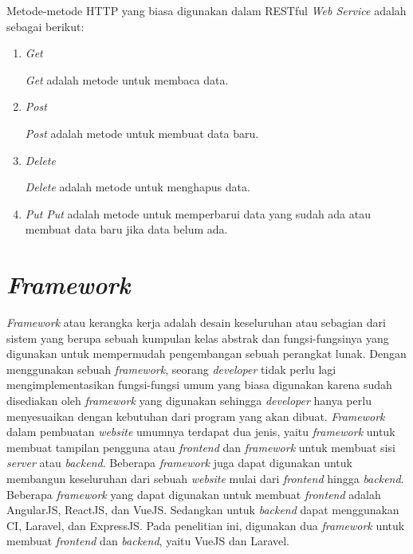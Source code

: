 	Metode-metode HTTP yang biasa digunakan dalam RESTful \textit{Web Service} adalah sebagai berikut:

\begin{enumerate}

	\item \textit{Get}

		\textit{Get} adalah metode untuk membaca data.

	\item \textit{Post}

		\textit{Post} adalah metode untuk membuat data baru.

	\item \textit{Delete}

		\textit{Delete} adalah metode untuk menghapus data.

	\item \textit{Put}
		\textit{Put} adalah metode untuk memperbarui data yang sudah ada atau membuat data baru jika data belum ada.
\end{enumerate}

\section{\textit{Framework}}

	\textit{Framework} atau kerangka kerja adalah desain keseluruhan atau sebagian dari sistem yang berupa sebuah kumpulan kelas abstrak dan fungsi-fungsinya yang digunakan untuk mempermudah pengembangan sebuah perangkat lunak. Dengan menggunakan sebuah \textit{framework}, seorang \textit{developer} tidak perlu lagi mengimplementasikan fungsi-fungsi umum yang biasa digunakan karena sudah disediakan oleh \textit{framework} yang digunakan sehingga \textit{developer} hanya perlu menyesuaikan dengan kebutuhan dari program yang akan dibuat. \textit{Framework} dalam pembuatan \textit{website} umumnya terdapat dua jenis, yaitu \textit{framework} untuk membuat tampilan pengguna atau \textit{frontend} dan \textit{framework} untuk membuat sisi \textit{server} atau \textit{backend}. Beberapa \textit{framework} juga dapat digunakan untuk membangun keseluruhan dari sebuah \textit{website} mulai dari \textit{frontend} hingga \textit{backend}. Beberapa \textit{framework} yang dapat digunakan untuk membuat \textit{frontend} adalah AngularJS, ReactJS, dan VueJS. Sedangkan untuk \textit{backend} dapat menggunakan CI, Laravel, dan ExpressJS. Pada penelitian ini, digunakan dua \textit{framework} untuk membuat \textit{frontend} dan \textit{backend}, yaitu VueJS dan Laravel.

